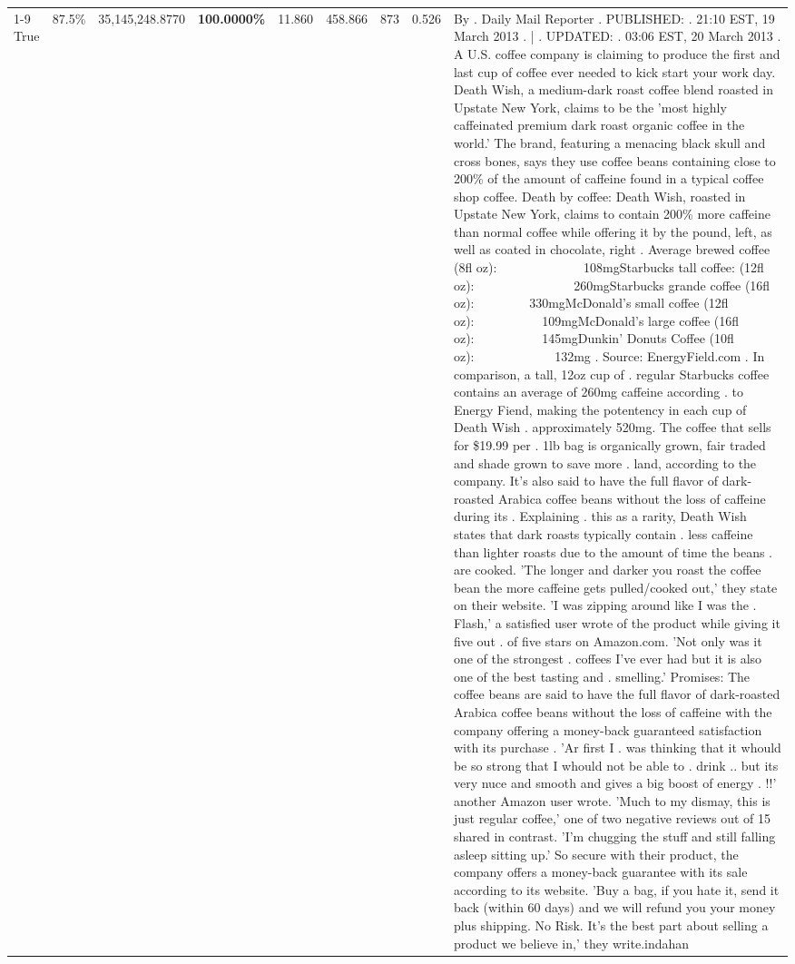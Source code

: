 \begin{table}[H]
{\begin{tabular}{lllrlllll}
\cline{1-9}
True & 87.5\% & 35,145,248.8770 & \bfseries \color{red} 100.0000\% & 11.860 & 458.866 & 873 & 0.526 & By . Daily Mail Reporter . PUBLISHED: . 21:10 EST, 19 March 2013 . | . UPDATED: . 03:06 EST, 20 March 2013 . A U.S. coffee company is claiming to produce the first and last cup of coffee ever needed to kick start your work day. Death Wish, a medium-dark roast coffee blend roasted in Upstate New York, claims to be the 'most highly caffeinated premium dark roast organic coffee in the world.' The brand, featuring a menacing black skull and cross bones, says they use coffee beans containing close to 200\% of the amount of caffeine found in a typical coffee shop coffee. Death by coffee: Death Wish, roasted in Upstate New York, claims to contain 200\% more caffeine than normal coffee while offering it by the pound, left, as well as coated in chocolate, right . Average brewed coffee (8fl oz):              108mgStarbucks tall coffee: (12fl oz):                260mgStarbucks grande coffee (16fl oz):         330mgMcDonald's small coffee (12fl oz):           109mgMcDonald's large coffee (16fl oz):           145mgDunkin' Donuts Coffee (10fl oz):             132mg . Source: EnergyField.com . In comparison, a tall, 12oz cup of . regular Starbucks coffee contains an average of 260mg caffeine according . to Energy Fiend, making the potentency in each cup of Death Wish . approximately 520mg. The coffee that sells for \$19.99 per . 1lb bag is organically grown, fair traded and shade grown to save more . land, according to the company. It's also said to have the full flavor of dark-roasted Arabica coffee beans without the loss of caffeine during its . Explaining . this as a rarity, Death Wish states that dark roasts typically contain . less caffeine than lighter roasts due to the amount of time the beans . are cooked. 'The longer and darker you roast the coffee bean the more caffeine gets pulled/cooked out,' they state on their website. 'I was zipping around like I was the . Flash,' a satisfied user wrote of the product while giving it five out . of five stars on Amazon.com. 'Not only was it one of the strongest . coffees I've ever had but it is also one of the best tasting and . smelling.’ Promises: The coffee beans are said to have the full flavor of dark-roasted Arabica coffee beans without the loss of caffeine with the company offering a money-back guaranteed satisfaction with its purchase . 'Ar first I . was thinking that it whould be so strong that I whould not be able to . drink .. but its very nuce and smooth and gives a big boost of energy . !!' another Amazon user wrote. 'Much to my dismay, this is just regular coffee,' one of two negative reviews out of 15 shared in contrast. 'I'm chugging the stuff and still falling asleep sitting up.' So secure with their product, the company offers a money-back guarantee with its sale according to its website. 'Buy a bag, if you hate it, send it back (within 60 days) and we will refund you your money plus shipping. No Risk. It’s the best part about selling a product we believe in,' they write.indahan \\

\end{tabular}}
\end{table}
